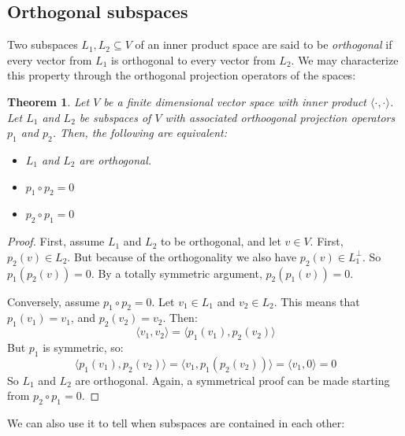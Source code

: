 \documentclass[12pt, a4paper]{article}
\newtheorem{theorem}{Theorem}[section]
\numberwithin{equation}{section}
\begin{document}
\subsection{Orthogonal subspaces}
Two subspaces $L_1, L_2\subseteq V$ of an inner product space are said to be \textit{orthogonal} if every vector from $L_1$ is orthogonal to every vector from $L_2$. We may characterize this property through the orthogonal projection operators of the spaces:
\begin{theorem}
\label{projection_lemma1}
Let $V$ be a finite dimensional vector space with inner product $\langle\cdot,\cdot\rangle$. Let $L_1$ and $L_2$ be subspaces of $V$ with associated orthoogonal projection operators $p_1$ and $p_2$. Then, the following are equivalent:
\begin{itemize}
\item $L_1$ and $L_2$ are orthogonal.
\item $p_1\circ p_2=0$
\item $p_2\circ p_1=0$
\end{itemize}
\end{theorem}
\begin{proof}
First, assume $L_1$ and $L_2$ to be orthogonal, and let $v\in V$. First, $p_2(v)\in L_2$. But because of the orthogonality we also have $p_2(v)\in L_1^\perp$. So $p_1(p_2(v))=0$. By a totally symmetric argument, $p_2(p_1(v))=0$.

Conversely, assume $p_1\circ p_2=0$. Let $v_1\in L_1$ and $v_2\in L_2$. This means that $p_1(v_1)=v_1$, and $p_2(v_2)=v_2$. Then:
\begin{equation}
\langle v_1,v_2\rangle=\langle p_1(v_1),p_2(v_2)\rangle
\end{equation}
But $p_1$ is symmetric, so:
\begin{equation}
\langle p_1(v_1),p_2(v_2)\rangle=\langle v_1,p_1(p_2(v_2))\rangle=\langle v_1,0\rangle=0
\end{equation}
So $L_1$ and $L_2$ are orthogonal. Again, a symmetrical proof can be made starting from $p_2\circ p_1=0$.
\end{proof}

We can also use it to tell when subspaces are contained in each other:
\end{document}
